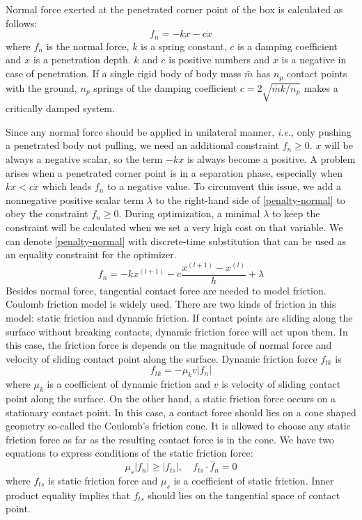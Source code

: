 \documentclass[master,english,final]{kaist-ucs}
\begin{document}
Normal force exerted at the penetrated corner point of the box is calculated as follows:
\begin{equation}\label{penalty-normal}
f_n = -k x - c \dot{x}
\end{equation}
where $f_n$ is the normal force, $k$ is a spring constant, $c$ is a damping coefficient and $x$ is
a penetration depth. $k$ and $c$ is positive numbers and $x$ is a negative in case of penetration.
If a single rigid body of body mass $\bar{m}$ has $n_p$ contact points with the ground,
$n_p$ springs of the damping coefficient $c=2\sqrt{\bar{m}k/n_p}$ makes a critically damped system.

Since any normal force should be applied in unilateral manner, \emph{i.e.},
only pushing a penetrated body not pulling, we need an additional constraint $f_n \geq 0$.
$x$ will be always a negative scalar, so the term $-kx$ is always become a positive.
A problem arises when a penetrated corner point is in a separation phase,
especially when $kx < c\dot{x}$ which leads $f_n$ to a negative value.
To circumvent this issue, we add a nonnegative positive scalar term $\lambda$ to the right-hand side
of \eqref{penalty-normal} to obey the constraint $f_n \geq 0$. During optimization,
a minimal $\lambda$ to keep the constraint will be calculated
when we set a very high cost on that variable. We can denote \eqref{penalty-normal} with
discrete-time substitution that can be used as an equality constraint for the optimizer.
\begin{equation}\label{penalty-normal-discretized}
f_n = -k x^{(l+1)} - c \frac{x^{(l+1)} - x^{(l)}}{h} + \lambda
\end{equation}
Besides normal force, tangential contact force are needed to model friction.
Coulomb friction model is widely used.
There are two kinds of friction in this model: static friction and dynamic friction.
If contact points are sliding along the surface without breaking contacts,
dynamic friction force will act upon them. In this case, the friction force is depends
on the magnitude of normal force and velocity of sliding contact point along the surface.
Dynamic friction force $f_{tk}$ is
\begin{equation}\label{dynamic-friction}
f_{tk} = -\mu_k v |f_n|
\end{equation}
where $\mu_k$ is a coefficient of dynamic friction
and $v$ is velocity of sliding contact point along the surface.
On the other hand, a static friction force occurs on a stationary contact point.
In this case, a contact force should lies on a cone shaped geometry so-called
the Coulomb's friction cone. It is allowed to choose any static friction force as far as
the resulting contact force is in the cone.
We have two equations to express conditions of the static friction force:
\begin{equation}\label{static-friction}
\mu_s |f_n| \geq |f_{ts}|, \quad f_{ts} \cdot \hat{f}_n = 0
\end{equation}
where $f_{ts}$ is static friction force and $\mu_s$ is a coefficient of static friction.
Inner product equality implies that $f_{ts}$ should lies on the tangential space of contact point.
\end{document}
